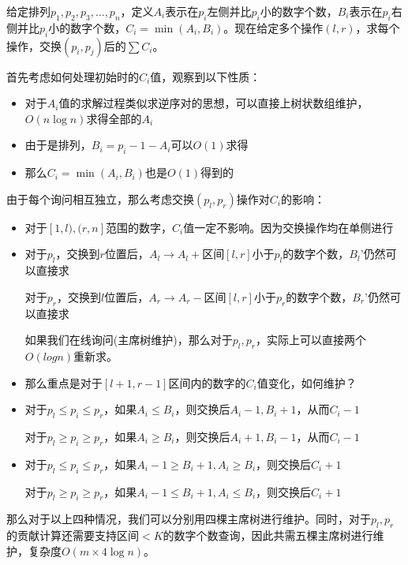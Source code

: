 \documentclass[]{article}
\providecommand{\tightlist}{%
  \setlength{\itemsep}{0pt}\setlength{\parskip}{0pt}}
\begin{document}
给定排列\(p_1, p_2, p_3,\dots, p_n\)，定义\(A_i\)表示在\(p_i\)左侧并比\(p_i\)小的数字个数，\(B_i\)表示在\(p_i\)右侧并比\(p_i\)小的数字个数，\(C_i = \min(A_i, B_i)\)。现在给定多个操作\((l, r)\)，求每个操作，交换\((p_i, p_j)\)后的\(\sum C_i\)。

首先考虑如何处理初始时的\(C_i\)值，观察到以下性质：

\begin{itemize}
\tightlist
\item
  对于\(A_i\)值的求解过程类似求逆序对的思想，可以直接上树状数组维护，\(O(n\log n)\)求得全部的\(A_i\)
\item
  由于是排列，\(B_i = p_i - 1 - A_i\)可以\(O(1)\)求得
\item
  那么\(C_i = \min(A_i, B_i)\)也是\(O(1)\)得到的
\end{itemize}

由于每个询问相互独立，那么考虑交换\((p_l, p_r)\)操作对\(C_i\)的影响：

\begin{itemize}
\item
  对于\([1, l), (r , n]\)范围的数字，\(C_i\)值一定不影响。因为交换操作均在单侧进行
\item
  对于\(p_l\)，交换到\(r\)位置后，\(A_l \rightarrow A_l + 区间[l,r]小于p_l的数字个数\)，\(B_l’\)仍然可以直接求

  对于\(p_r\)，交换到\(l\)位置后，\(A_r \rightarrow A_r - 区间[l ,r]小于p_r的数字个数\)，\(B_r’\)仍然可以直接求

  如果我们在线询问(主席树维护)，那么对于\(p_l,p_r\)，实际上可以直接两个\(O(logn)\)重新求。
\item
  那么重点是对于\([l + 1, r - 1]\)区间内的数字的\(C_i\)值变化，如何维护？
\item
  对于\(p_l \leq p_i \leq p_r\)，如果\(A_i \leq B_i\)，则交换后\(A_i - 1, B_i + 1\)，从而\(C_i - 1\)

  对于\(p_l \geq p_i \geq p_r\)，如果\(A_i \geq B_i\)，则交换后\(A_i + 1, B_i - 1\)，从而\(C_i -1\)
\item
  对于\(p_l \leq p_i \leq p_r\)，如果\(A_i - 1 \geq B_i + 1, A_i \geq B_i\)，则交换后\(C_i + 1\)

  对于\(p_l \geq p_i \geq p_r\)，如果\(A_i - 1 \leq B_i + 1, A_i \leq B_i\)，则交换后\(C_i + 1\)
\end{itemize}

那么对于以上四种情况，我们可以分别用四棵主席树进行维护。同时，对于\(p_l, p_r\)的贡献计算还需要支持区间\(<K\)的数字个数查询，因此共需五棵主席树进行维护，复杂度\(O(m \times 4 \log n)\)。
\end{document}
